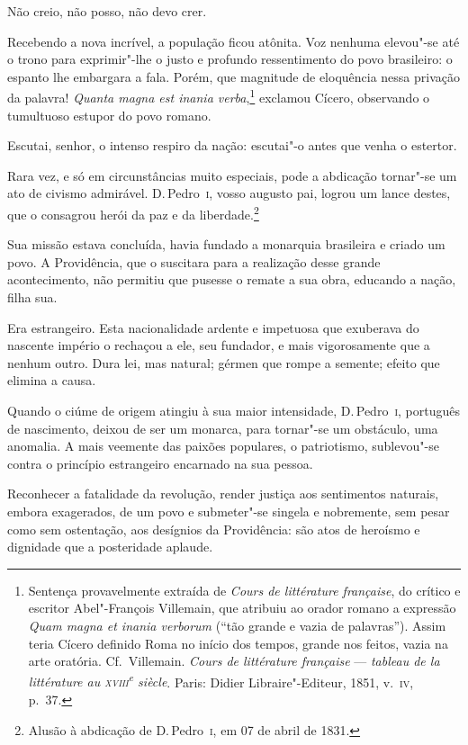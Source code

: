 \begin{linenumbers}
Não creio, não posso, não devo crer. 

Recebendo a nova incrível, a população ficou atônita. Voz nenhuma
elevou"-se até o trono para exprimir"-lhe o justo e profundo
ressentimento do povo brasileiro: o espanto lhe embargara a fala.
Porém, que magnitude de eloquência nessa privação da palavra!
\textit{Quanta magna est inania
verba},\footnote{ Sentença provavelmente extraída de
 \textit{Cours de littérature française}, do crítico e escritor Abel"-François Villemain, 
que atribuiu ao orador romano a expressão \textit{Quam magna et inania verborum} 
(``tão grande e vazia de palavras''). Assim teria Cícero definido Roma no início dos tempos, 
grande nos feitos, vazia na arte oratória. Cf.~Villemain. \textit{Cours de littérature
française} --- \textit{tableau de la littérature au \textsc{xviii}\textsuperscript{e} siècle}.
Paris: Didier Libraire"-Editeur, 1851, v.~\textsc{iv}, p.~37.} 
exclamou Cícero, observando o tumultuoso estupor do povo romano. 

 Escutai, senhor, o intenso respiro da nação: escutai"-o antes que venha o estertor. 

 Rara vez, e só em circunstâncias muito especiais, pode a abdicação
tornar"-se um ato de civismo admirável. D.\,Pedro~\textsc{i}, vosso augusto pai,
logrou um lance destes, que o consagrou herói da paz e da
liberdade.\footnote{ Alusão à abdicação de D.\,Pedro~\textsc{i}, em 07 de abril de 1831.}
 

 Sua missão estava concluída, havia fundado a monarquia brasileira e
criado um povo. A Providência, que o suscitara para a realização desse
grande acontecimento, não permitiu que pusesse o remate a sua obra,
educando a nação, filha sua. 

 Era estrangeiro. Esta nacionalidade ardente e impetuosa que exuberava
do nascente império o rechaçou a ele, seu fundador, e mais
vigorosamente que a nenhum outro. Dura lei, mas natural; gérmen que
rompe a semente; efeito que elimina a causa. 

 Quando o ciúme de origem atingiu à sua maior intensidade, D.\,Pedro~\textsc{i},
português de nascimento, deixou de ser um monarca, para tornar"-se um
obstáculo, uma anomalia. A mais veemente das paixões populares, o
patriotismo, sublevou"-se contra o princípio estrangeiro encarnado na sua pessoa.

 Reconhecer a fatalidade da revolução, render justiça aos sentimentos
naturais, embora exagerados, de um povo e submeter"-se singela e
nobremente, sem pesar como sem ostentação, aos desígnios da
Providência: são atos de heroísmo e dignidade que a posteridade aplaude. 


\end{linenumbers}
